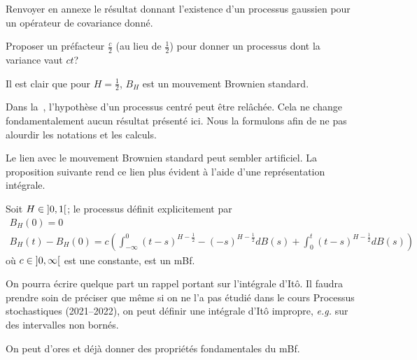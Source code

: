 
\begin{alert}
  Renvoyer en annexe le résultat donnant l'existence d'un processus
  gaussien pour un opérateur de covariance donné.
\end{alert}

\begin{question}
  Proposer un préfacteur $\frac{c}{2}$ (au lieu de $\frac{1}{2}$) pour
  donner un processus dont la variance vaut $ct$?
\end{question}

Il est clair que pour $H= \frac{1}{2}$, $B_H$ est un mouvement
Brownien standard.

\begin{remarque}
  Dans la~, l'hypothèse d'un processus centré
  peut être relâchée. Cela ne change fondamentalement aucun résultat
  présenté ici. Nous la formulons afin de ne pas alourdir les
  notations et les calculs.
\end{remarque}

Le lien avec le mouvement Brownien standard peut sembler
artificiel. La proposition suivante rend ce lien plus évident à l'aide
d'une représentation intégrale.

\begin{proposition}
  Soit $H\in\left]0,1\right[$; le processus définit explicitement par
  \begin{gather*}
    B_H(0) = 0 \\
    B_H(t) - B_H(0) = c\left(\int_{-\infty}^0 (t-s)^{H- \frac{1}{2}} - (-s)^{H- \frac{1}{2} } dB(s) + \int_0^t (t-s)^{H- \frac{1}{2}} dB(s)\right)
  \end{gather*}
  où $c\in\left]0,\infty\right[$ est une constante, est un mBf.
\end{proposition}

\begin{alert}
  On pourra écrire quelque part un rappel portant sur l'intégrale
  d'Itô. Il faudra prendre soin de préciser que même si on ne l'a pas
  étudié dans le cours \og{}Processus stochastiques\fg{} (2021--2022),
  on peut définir une intégrale d'Itô impropre, \emph{e.g.} sur des
  intervalles non bornés.
\end{alert}

On peut d'ores et déjà donner des propriétés fondamentales du mBf.

